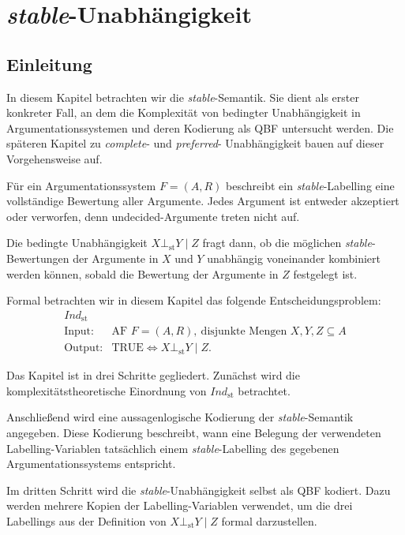 \chapter{\textit{stable}-Unabhängigkeit}
\label{ch:stable}


\section{Einleitung}
\label{sec:st-ci-einleitung}

In diesem Kapitel betrachten wir die \textit{stable}-Semantik. Sie dient als erster konkreter Fall, 
an dem die Komplexität von bedingter Unabhängigkeit in Argumentationssystemen und deren Kodierung 
als QBF untersucht werden. Die späteren Kapitel zu \textit{complete}- und \textit{preferred}-
Unabhängigkeit bauen auf dieser Vorgehensweise auf.

Für ein Argumentationssystem \(F=(A,R)\) beschreibt ein
\textit{stable}-Labelling eine vollständige Bewertung aller Argumente.
Jedes Argument ist entweder akzeptiert oder verworfen, denn undecided-Argumente treten nicht
auf. 

Die bedingte Unabhängigkeit \( X \bot_{\mathrm{st}} Y \mid Z\)
fragt dann, ob die möglichen \textit{stable}-Bewertungen der Argumente in \(X\)
und \(Y\) unabhängig voneinander kombiniert werden können, sobald die Bewertung
der Argumente in \(Z\) festgelegt ist.

Formal betrachten wir in diesem Kapitel das folgende Entscheidungsproblem:
\[
\begin{array}{ll}
\textit{Ind}_{\mathrm{st}}\\
\text{Input:}  & \text{AF } F=(A,R),\ \text{disjunkte Mengen } X,Y,Z \subseteq A \\
\text{Output:} & \text{TRUE} \Longleftrightarrow X \bot_{\mathrm{st}} Y \mid Z.
\end{array}
\]

Das Kapitel ist in drei Schritte gegliedert. Zunächst wird die
komplexitätstheoretische Einordnung von \(\textit{Ind}_{\mathrm{st}}\)
betrachtet. 

Anschließend wird eine aussagenlogische Kodierung der \textit{stable}-Semantik
angegeben. Diese Kodierung beschreibt, wann eine Belegung der verwendeten
Labelling-Variablen tatsächlich einem \textit{stable}-Labelling des gegebenen
Argumentationssystems entspricht. 

Im dritten Schritt wird die \textit{stable}-Unabhängigkeit selbst als QBF kodiert.
Dazu werden mehrere Kopien der Labelling-Variablen verwendet, um die drei
Labellings aus der Definition von \(X \bot_{\mathrm{st}} Y \mid Z\) formal
darzustellen.

